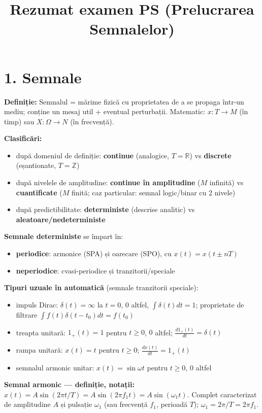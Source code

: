 \documentclass[10pt,a4paper]{article}
\title{\vspace{-2cm}Rezumat examen PS (Prelucrarea Semnalelor)}
\author{}
\date{}
\begin{document}
\maketitle
\vspace{-1.2cm}

\section*{1. Semnale}
\textbf{Definiție:} Semnalul = mărime fizică cu proprietatea de a se propaga într-un mediu; conține un mesaj util + eventual perturbații. Matematic: $x:T\to M$ (în timp) sau $X:\Omega\to N$ (în frecvență).

\textbf{Clasificări:}
\begin{itemize}
\item după domeniul de definiție: \textbf{continue} (analogice, $T=\mathbb{R}$) vs \textbf{discrete} (eșantionate, $T=\mathbb{Z}$)
\item după nivelele de amplitudine: \textbf{continue în amplitudine} ($M$ infinită) vs \textbf{cuantificate} ($M$ finită; caz particular: semnal logic/binar cu 2 nivele)
\item după predictibilitate: \textbf{deterministe} (descrise analitic) vs \textbf{aleatoare/nedeterministe}
\end{itemize}

\textbf{Semnale deterministe} se împart în:
\begin{itemize}
\item \textbf{periodice}: armonice (SPA) și oarecare (SPO), cu $x(t)=x(t\pm nT)$
\item \textbf{neperiodice}: cvasi-periodice și tranzitorii/speciale
\end{itemize}

\textbf{Tipuri uzuale în automatică} (semnale tranzitorii speciale):
\begin{itemize}
\item impuls Dirac: $\delta(t)=\infty$ la $t=0$, $0$ altfel, $\int\delta(t)dt=1$; proprietate de filtrare $\int f(t)\delta(t-t_0)dt=f(t_0)$
\item treapta unitară: $1_+(t)=1$ pentru $t\ge0$, $0$ altfel; $\frac{d1_+(t)}{dt}=\delta(t)$
\item rampa unitară: $x(t)=t$ pentru $t\ge0$; $\frac{dx(t)}{dt}=1_+(t)$
\item semnalul armonic unitar: $x(t)=\sin\omega t$ pentru $t\ge0$, $0$ altfel
\end{itemize}

\textbf{Semnal armonic — definiție, notații:} $x(t)=A\sin(2\pi t/T)=A\sin(2\pi f_1 t)=A\sin(\omega_1 t)$. Complet caracterizat de amplitudine $A$ și pulsație $\omega_1$ (sau frecvență $f_1$, perioadă $T$); $\omega_1=2\pi/T=2\pi f_1$.
\end{document}
